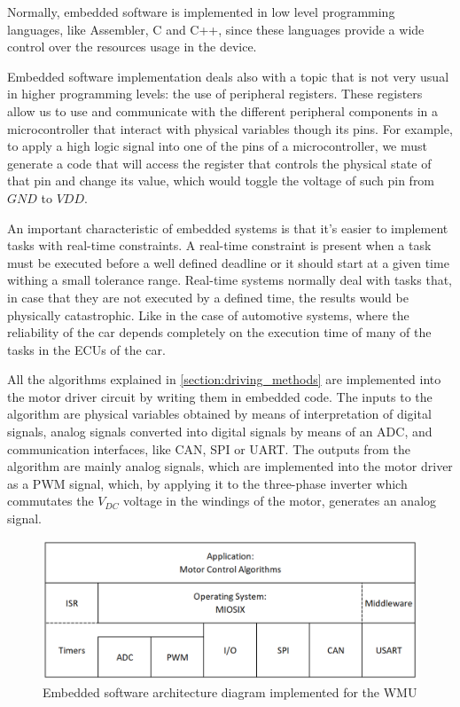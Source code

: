 Normally, embedded software is implemented in low level programming languages, like Assembler, C and C++, since these languages provide a wide control over the resources usage in the device. 

Embedded software implementation deals also with a topic that is not very usual in higher programming levels: the use of peripheral registers. These registers allow us to use and communicate with the different peripheral components in a microcontroller that interact with physical variables though its pins. For example, to apply a high logic signal into one of the pins of a microcontroller, we must generate a code that will access the register that controls the physical state of that pin and change its value, which would toggle the voltage of such pin from $GND$ to $VDD$.

An important characteristic of embedded systems is that it's easier to implement tasks with real-time constraints. A real-time constraint is present when a task must be executed before a well defined deadline or it should start at a given time withing a small tolerance range. Real-time systems normally deal with tasks that, in case that they are not executed by a defined time, the results would be physically catastrophic. Like in the case of automotive systems, where the reliability of the car depends completely on the execution time of many of the tasks in the \ac{ECU}s of the car.

All the algorithms explained in \ref{section:driving_methods} are implemented into the motor driver circuit by writing them in embedded code. The inputs to the algorithm are physical variables obtained by means of interpretation of digital signals, analog signals converted into digital signals by means of an \acf{ADC}, and communication interfaces, like \ac{CAN}, \ac{SPI} or \ac{UART}. The outputs from the algorithm are mainly analog signals, which are implemented into the motor driver as a \ac{PWM} signal, which, by applying it to the three-phase inverter which commutates the $V_{DC}$ voltage in the windings of the motor, generates an analog signal.

\begin{figure}[htbp]
\centering
\includegraphics[width=\textwidth]{Images/firmware_architecture.png} 
\caption[Embedded Software Architecture Diagram]{Embedded software architecture diagram implemented for the WMU}
\label{fig:firmware}
\end{figure}

